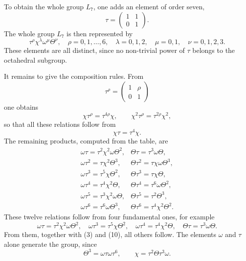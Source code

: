 \documentclass[11pt]{article}
\providecommand{\mat}[4]{\begin{pmatrix}#1&#2\\#3&#4\end{pmatrix}}
\providecommand{\mat}[4]{\begin{pmatrix}#1&#2\\#3&#4\end{pmatrix}}
\begin{document}
To obtain the whole group $L_7$, one adds an element of order seven,
\begin{equation}
 \tau=\mat{1}{1}{0}{1}.
 \tag{7}
\end{equation}
The whole group $L_7$ is then represented by
\begin{equation}
 \tau^{\rho}\chi^{\lambda}\omega^{\mu}\Theta^{\nu},
 \quad \rho=0,1,\ldots,6,
 \quad \lambda=0,1,2,
 \quad \mu=0,1,
 \quad \nu=0,1,2,3.
 \tag{8}
\end{equation}
These elements are all distinct, since no non-trivial power of $\tau$ belongs to the octahedral subgroup.

It remains to give the composition rules. From
\begin{equation}
 \tau^{\rho}=\mat{1}{\rho}{0}{1}
 \tag{9}
\end{equation}
one obtains
\begin{equation}
 \chi\tau^{\rho}=\tau^{4\rho}\chi,
 \qquad
 \chi^2\tau^{\rho}=\tau^{2\rho}\chi^2,
 \tag{10}
\end{equation}
so that all these relations follow from
\begin{equation}
 \chi\tau=\tau^4\chi.
 \tag{11}
\end{equation}
The remaining products, computed from the table, are
\begin{equation}
\begin{array}{ll}
 \omega\tau=\tau^2\chi^2\omega\Theta^2,&
 \Theta\tau=\tau^3\omega\Theta,\\
 \omega\tau^2=\tau\chi^2\Theta^3,&
 \Theta\tau^2=\tau\chi\omega\Theta^3,\\
 \omega\tau^3=\tau^5\chi\Theta^2,&
 \Theta\tau^3=\tau\chi\Theta,\\
 \omega\tau^4=\tau^4\chi^2\Theta,&
 \Theta\tau^4=\tau^6\omega\Theta^2,\\
 \omega\tau^5=\tau^3\chi^2\omega\Theta,&
 \Theta\tau^5=\tau^2\Theta^3,\\
 \omega\tau^6=\tau^6\omega\Theta^3,&
 \Theta\tau^6=\tau^4\chi^2\Theta^2.
\end{array}
\tag{12}
\end{equation}
These twelve relations follow from four fundamental ones, for example
\begin{equation}
 \omega\tau=\tau^2\chi^2\omega\Theta^2,
 \quad
 \omega\tau^3=\tau^5\chi\Theta^2,
 \quad
 \omega\tau^4=\tau^4\chi^2\Theta,
 \quad
 \Theta\tau=\tau^3\omega\Theta.
 \tag{13}
\end{equation}
From them, together with (3) and (10), all others follow. The elements $\omega$ and $\tau$ alone generate the group, since
\begin{equation}
 \Theta^3=\omega\tau\omega\tau^6,
 \qquad
 \chi=\tau^2\Theta\tau^3\omega.
 \tag{14}
\end{equation}
\end{document}
